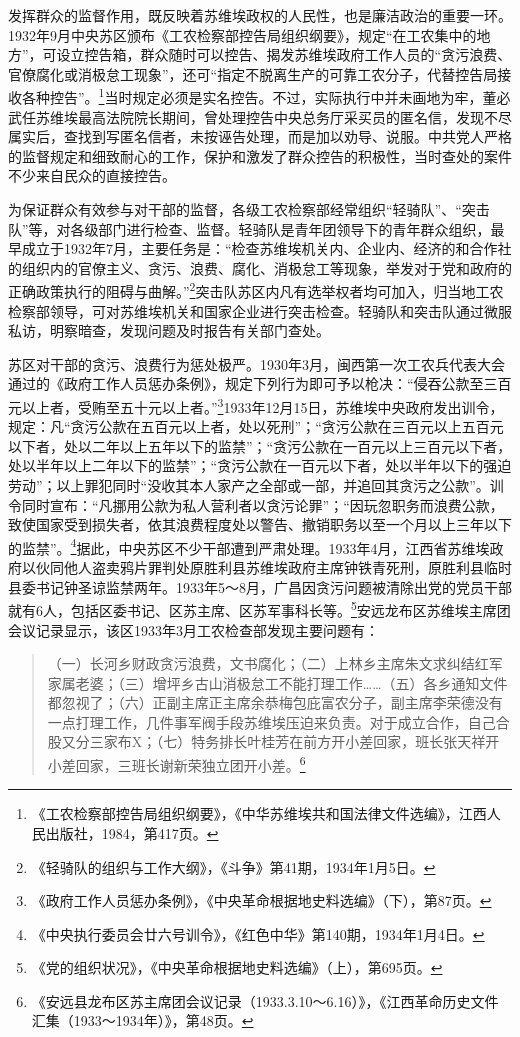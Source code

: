 发挥群众的监督作用，既反映着苏维埃政权的人民性，也是廉洁政治的重要一环。1932年9月中央苏区颁布《工农检察部控告局组织纲要》，规定“在工农集中的地方”，可设立控告箱，群众随时可以控告、揭发苏维埃政府工作人员的“贪污浪费、官僚腐化或消极怠工现象”，还可“指定不脱离生产的可靠工农分子，代替控告局接收各种控告”。\footnote{《工农检察部控告局组织纲要》，《中华苏维埃共和国法律文件选编》，江西人民出版社，1984，第417页。}当时规定必须是实名控告。不过，实际执行中并未画地为牢，董必武任苏维埃最高法院院长期间，曾处理控告中央总务厅采买员的匿名信，发现不尽属实后，查找到写匿名信者，未按诬告处理，而是加以劝导、说服。中共党人严格的监督规定和细致耐心的工作，保护和激发了群众控告的积极性，当时查处的案件不少来自民众的直接控告。


为保证群众有效参与对干部的监督，各级工农检察部经常组织“轻骑队”、“突击队”等，对各级部门进行检查、监督。轻骑队是青年团领导下的青年群众组织，最早成立于1932年7月，主要任务是：“检查苏维埃机关内、企业内、经济的和合作社的组织内的官僚主义、贪污、浪费、腐化、消极怠工等现象，举发对于党和政府的正确政策执行的阻碍与曲解。”\footnote{《轻骑队的组织与工作大纲》，《斗争》第41期，1934年1月5日。}突击队苏区内凡有选举权者均可加入，归当地工农检察部领导，可对苏维埃机关和国家企业进行突击检查。轻骑队和突击队通过微服私访，明察暗查，发现问题及时报告有关部门查处。


苏区对干部的贪污、浪费行为惩处极严。1930年3月，闽西第一次工农兵代表大会通过的《政府工作人员惩办条例》，规定下列行为即可予以枪决：“侵吞公款至三百元以上者，受贿至五十元以上者。”\footnote{《政府工作人员惩办条例》，《中央革命根据地史料选编》（下），第87页。}1933年12月15日，苏维埃中央政府发出训令，规定：凡“贪污公款在五百元以上者，处以死刑”；“贪污公款在三百元以上五百元以下者，处以二年以上五年以下的监禁”；“贪污公款在一百元以上三百元以下者，处以半年以上二年以下的监禁”；“贪污公款在一百元以下者，处以半年以下的强迫劳动”；以上罪犯同时“没收其本人家产之全部或一部，并追回其贪污之公款”。训令同时宣布：“凡挪用公款为私人营利者以贪污论罪”；“因玩忽职务而浪费公款，致使国家受到损失者，依其浪费程度处以警告、撤销职务以至一个月以上三年以下的监禁”。\footnote{《中央执行委员会廿六号训令》，《红色中华》第140期，1934年1月4日。}据此，中央苏区不少干部遭到严肃处理。1933年4月，江西省苏维埃政府以伙同他人盗卖鸦片罪判处原胜利县苏维埃政府主席钟铁青死刑，原胜利县临时县委书记钟圣谅监禁两年。1933年5～8月，广昌因贪污问题被清除出党的党员干部就有6人，包括区委书记、区苏主席、区苏军事科长等。\footnote{《党的组织状况》，《中央革命根据地史料选编》（上），第695页。}安远龙布区苏维埃主席团会议记录显示，该区1933年3月工农检查部发现主要问题有：

\begin{quote}

（一）长河乡财政贪污浪费，文书腐化；（二）上林乡主席朱文求纠结红军家属老婆；（三）增坪乡古山消极怠工不能打理工作……（五）各乡通知文件都忽视了；（六）正副主席正主席余恭梅包庇富农分子，副主席李荣德没有一点打理工作，几件事军阀手段苏维埃压迫来负责。对于成立合作，自己合股又分三家布X；（七）特务排长叶桂芳在前方开小差回家，班长张天祥开小差回家，三班长谢新荣独立团开小差。\footnote{《安远县龙布区苏主席团会议记录（1933.3.10～6.16）》，《江西革命历史文件汇集（1933～1934年）》，第48页。}
\end{quote}


